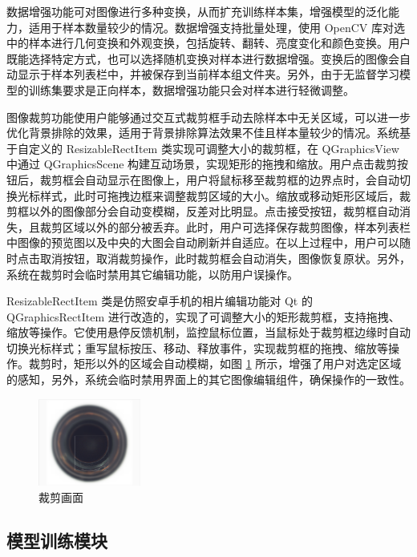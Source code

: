 \documentclass[
  ]{njuthesis}
\begin{document}
数据增强功能可对图像进行多种变换，从而扩充训练样本集，增强模型的泛化能力，适用于样本数量较少的情况。数据增强支持批量处理，使用 OpenCV 库对选中的样本进行几何变换和外观变换，包括旋转、翻转、亮度变化和颜色变换。用户既能选择特定方式，也可以选择随机变换对样本进行数据增强。变换后的图像会自动显示于样本列表栏中，并被保存到当前样本组文件夹。另外，由于无监督学习模型的训练集要求是正向样本，数据增强功能只会对样本进行轻微调整。

图像裁剪功能使用户能够通过交互式裁剪框手动去除样本中无关区域，可以进一步优化背景排除的效果，适用于背景排除算法效果不佳且样本量较少的情况。系统基于自定义的 ResizableRectItem 类实现可调整大小的裁剪框，在 QGraphicsView 中通过 QGraphicsScene 构建互动场景，实现矩形的拖拽和缩放。用户点击裁剪按钮后，裁剪框会自动显示在图像上，用户将鼠标移至裁剪框的边界点时，会自动切换光标样式，此时可拖拽边框来调整裁剪区域的大小。缩放或移动矩形区域后，裁剪框以外的图像部分会自动变模糊，反差对比明显。点击接受按钮，裁剪框自动消失，且裁剪区域以外的部分被丢弃。此时，用户可选择保存裁剪图像，样本列表栏中图像的预览图以及中央的大图会自动刷新并自适应。在以上过程中，用户可以随时点击取消按钮，取消裁剪操作，此时裁剪框会自动消失，图像恢复原状。另外，系统在裁剪时会临时禁用其它编辑功能，以防用户误操作。

ResizableRectItem 类是仿照安卓手机的相片编辑功能对 Qt 的 QGraphicsRectItem 进行改造的，实现了可调整大小的矩形裁剪框，支持拖拽、缩放等操作。它使用悬停反馈机制，监控鼠标位置，当鼠标处于裁剪框边缘时自动切换光标样式；重写鼠标按压、移动、释放事件，实现裁剪框的拖拽、缩放等操作。裁剪时，矩形以外的区域会自动模糊，如图 \ref{裁剪画面} 所示，增强了用户对选定区域的感知，另外，系统会临时禁用界面上的其它图像编辑组件，确保操作的一致性。

\begin{figure}[htb]
    \centering
    \includegraphics[width=0.3\textwidth]{images/裁剪画面.png}
    \caption{裁剪画面}
    \label{裁剪画面}
\end{figure}

\subsection{模型训练模块}
\end{document}

